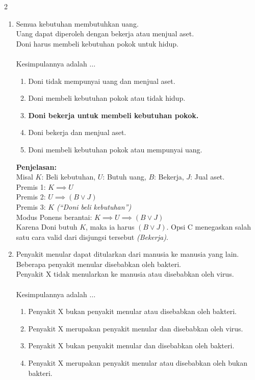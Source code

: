 \begin{multicols}{2}
\begin{enumerate}
  \item Semua kebutuhan membutuhkan uang. \\
    Uang dapat diperoleh dengan bekerja atau menjual aset. \\
    Doni harus membeli kebutuhan pokok untuk hidup. \\ \\
    Kesimpulannya adalah $\dots$
    \begin{enumerate}
    \item Doni tidak mempunyai uang dan menjual aset.
    \item Doni membeli kebutuhan pokok atau tidak hidup.
    \item \textbf{Doni bekerja untuk membeli kebutuhan pokok.}
    \item Doni bekerja dan menjual aset.
    \item Doni membeli kebutuhan pokok atau mempunyai uang.
    \end{enumerate}
    \textbf{Penjelasan: } \\
    Misal $K$: Beli kebutuhan, $U$: Butuh uang, $B$: Bekerja, $J$: Jual aset. \\
    Premis 1: $K \implies U$ \\
    Premis 2: $U \implies (B \lor J)$ \\
    Premis 3: $K$ \textit{(``Doni beli kebutuhan'')} \\
    Modus Ponens berantai: $K \implies U \implies (B \lor J)$ \\
    Karena Doni butuh $K$, maka ia harus $(B \lor J)$. Opsi C menegaskan salah satu cara valid dari disjungsi tersebut \textit{(Bekerja)}.
  \item Penyakit menular dapat ditularkan dari manusia ke manusia yang lain. \\
    Beberapa penyakit menular disebabkan oleh bakteri. \\
    Penyakit X tidak menularkan ke manusia atau disebabkan oleh virus. \\ \\
    Kesimpulannya adalah $\dots$
    \begin{enumerate}
    \item Penyakit X bukan penyakit menular atau disebabkan oleh bakteri.
    \item Penyakit X merupakan penyakit menular dan disebabkan oleh virus.
    \item Penyakit X bukan penyakit menular dan disebabkan oleh bakteri.
    \item Penyakit X merupakan penyakit menular atau disebabkan oleh bukan bakteri.

\end{enumerate}
\end{enumerate}
\end{multicols}
